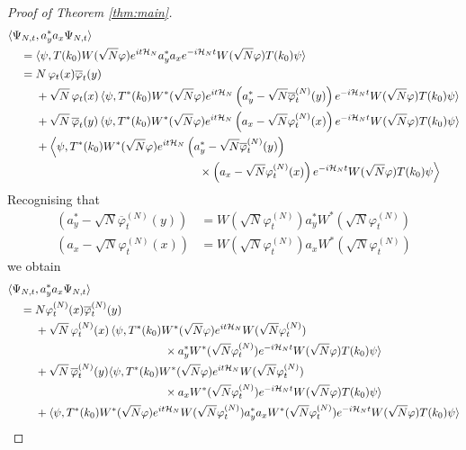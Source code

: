 \documentclass[11pt,a4paper,DIV11]{scrartcl}	%
\newcommand{\cH}{{\cal H}}
\begin{document}
\begin{proof}[Proof of Theorem \ref{thm:main}]
\[\begin{split}
\langle \Psi_{N,t}  &, a_y^* a_x \Psi_{N,t} \rangle \\ = \;  & \langle \psi, T(k_0) W (\sqrt{N} \varphi) e^{it \cH_N} a_y^* a_x e^{-i\cH_N t} W(\sqrt{N} \varphi) T(k_0) \psi \rangle \\  = \; & N \, \varphi_t (x) \overline{\varphi}_t (y) \\ &+  \sqrt{N} \, \varphi_t (x) \, \langle \psi, T^* (k_0) W^* (\sqrt{N} \varphi) e^{it \cH_N} \left(a_y^* - \sqrt{N} \overline{\varphi}^{(N)}_t (y)\right) e^{-i\cH_N t} W(\sqrt{N} \varphi) T(k_0) \psi \rangle \\  &+ \sqrt{N} \, \overline{\varphi}_t (y) \,  \langle \psi, T^* (k_0) W^* (\sqrt{N} \varphi) e^{it \cH_N} \left(a_x - \sqrt{N} \varphi^{(N)}_t (x) \right) e^{-i\cH_N t} W(\sqrt{N} \varphi) T(k_0) \psi \rangle \\ &+ \Big\langle \psi , T^* (k_0) W^* (\sqrt{N} \varphi) e^{it \cH_N} \left(a_y^* -\sqrt{N} \overline{\varphi}_t^{(N)} (y)\right) \\ &\hspace{5cm} \times \left(a_x - \sqrt{N} \varphi^{(N)}_t (x) \right) e^{-i\cH_N t} W(\sqrt{N} \varphi) T(k_0) \psi \Big\rangle \end{split}\]
Recognising that
\[ \begin{split} (a_y^* - \sqrt{N} \overline{\varphi}^{(N)}_t (y)) &= W (\sqrt{N} \varphi^{(N)}_t) a_y^* W^* (\sqrt{N} \varphi_t^{(N)}) \\ (a_x - \sqrt{N} \varphi^{(N)}_t (x)) &= W (\sqrt{N} \varphi^{(N)}_t) a_x W^* (\sqrt{N} \varphi_t^{(N)}) \end{split} \]
we obtain
\[ \begin{split} \langle \Psi_{N,t} &, a_y^* a_x \Psi_{N,t} \rangle \\ = \; &N \varphi_t^{(N)} (x) \overline{\varphi}_t^{(N)} (y) \\ &+ \sqrt{N} \, \varphi^{(N)}_t (x) \, \langle \psi, T^* (k_0) W^* (\sqrt{N} \varphi) e^{it \cH_N} W (\sqrt{N} \varphi^{(N)}_t) \\ &\hspace{4cm} \times a_y^* W^* (\sqrt{N} \varphi^{(N)}_t) e^{-i\cH_N t} W(\sqrt{N} \varphi) T(k_0) \psi \rangle \\  &+ \sqrt{N} \, \overline{\varphi}^{(N)}_t (y)  \langle \psi, T^* (k_0) W^* (\sqrt{N} \varphi) e^{it \cH_N} W (\sqrt{N} \varphi^{(N)}_t) \\ &\hspace{4cm} \times a_x W^* (\sqrt{N} \varphi^{(N)}_t) e^{-i\cH_N t} W(\sqrt{N} \varphi) T(k_0) \psi \rangle \\ &+ \langle \psi , T^* (k_0) W^* (\sqrt{N} \varphi) e^{it \cH_N} W (\sqrt{N} \varphi^{(N)}_t) a_y^* a_x W^* (\sqrt{N} \varphi^{(N)}_t)  e^{-i\cH_N t} W(\sqrt{N} \varphi) T(k_0) \psi \rangle \end{split}\]

\end{proof}
\end{document}
